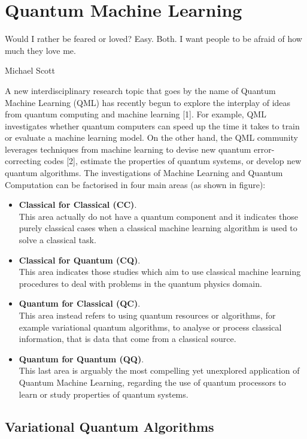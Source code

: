 \chapter{Quantum Machine Learning}

\epigraph{Would I rather be feared or loved? Easy. Both. I want people to be afraid of how much they love 
me.}{Michael Scott}

A new interdisciplinary research topic that goes by the name of Quantum Machine Learning
(QML) has recently begun to explore the interplay of ideas from quantum computing and
machine learning [1].
For example, QML investigates whether quantum computers can speed up the time it takes
to train or evaluate a machine learning model. On the other hand, the QML community
leverages techniques from machine learning to devise new quantum error-correcting codes
[2], estimate the properties of quantum systems, or develop new quantum algorithms.
The investigations of Machine Learning and Quantum Computation can be factorised in four main areas (as shown in
figure):


\begin{itemize}
    \item \textbf{Classical for Classical (CC)}.\\ This area actually do not have a quantum component and 
    it indicates those purely classical cases when a classical machine learning algorithm is used to solve 
    a classical task.
    \item \textbf{Classical for Quantum (CQ)}.\\ This area indicates those studies which aim to use classical
    machine learning procedures to deal with problems in the quantum physics domain.
    \item \textbf{Quantum for Classical (QC)}.\\ This area instead refers to using quantum resources or algorithms, 
    for example variational quantum algorithms, to analyse or process classical information, 
    that is data that come from a classical source.
    \item \textbf{Quantum for Quantum (QQ)}.\\ This last area is arguably the most compelling yet unexplored
    application of Quantum Machine Learning, regarding the use of quantum processors to
    learn or study properties of quantum systems.
\end{itemize}


\section{Variational Quantum Algorithms}

